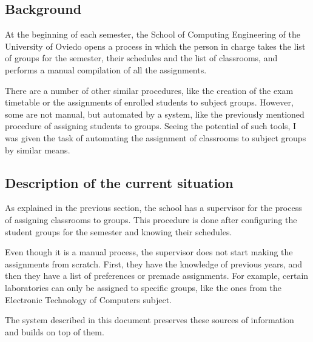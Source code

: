 \subsection{Background}

At the beginning of each semester, the School of Computing Engineering of the University of Oviedo opens a process in which the person in charge takes the list of groups for the semester, their schedules and the list of classrooms, and performs a manual compilation of all the assignments.

There are a number of other similar procedures, like the creation of the exam timetable or the assignments of enrolled students to subject groups. However, some are not manual, but automated by a system, like the previously mentioned procedure of assigning students to groups. Seeing the potential of such tools, I was given the task of automating the assignment of classrooms to subject groups by similar means. 

\subsection{Description of the current situation}

As explained in the previous section, the school has a supervisor for the process of assigning classrooms to groups. This procedure is done after configuring the student groups for the semester and knowing their schedules.

Even though it is a manual process, the supervisor does not start making the assignments from scratch. First, they have the knowledge of previous years, and then they have a list of preferences or premade assignments. For example, certain laboratories can only be assigned to specific groups, like the ones from the Electronic Technology of Computers subject.

The system described in this document preserves these sources of information and builds on top of them.


